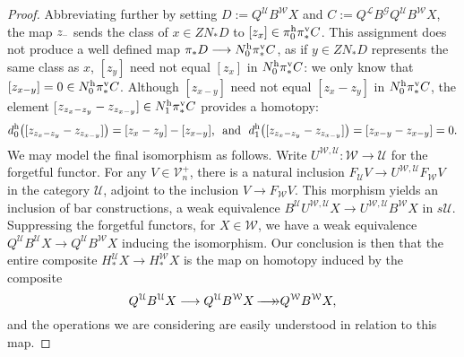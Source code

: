 \documentclass[11pt]{amsart}
\theoremstyle{plain}
\theoremstyle{definition}
\newcommand{\DASH}{\textup{--}}
\renewcommand{\to}{\longrightarrow}
\newcommand{\scrG}{\mathscr{G}}
\newcommand{\calU}{\mathcal{U}}
\newcommand{\calL}{\mathcal{L}}
\newcommand{\calV}{\mathcal{V}}
\newcommand{\calw}{\mathcal{W}}
\theoremstyle{plain}
\newcommand{\vect}[2]{\calV^{#1}_{#2}}
\newcommand{\BSW}{{\scrG}}
\newcommand{\epi}{{\,\makebox[0cm][l]{\ensuremath\to}\to}}
\begin{document}
\begin{Composite functor spectral sequences}
\begin{proof}
Abbreviating further by setting $D:=Q^{\calU}B^{\calw}X$ and $C:=Q^{\calL}B^{\BSW} Q^{\calU}B^{\calw}X$, the map $z_{\DASH}$ sends the class of $x\in ZN_*D$ to $[z_x]\in \pi_0^\textup{h}\pi^\textup{v}_*C$. This assignment does not produce a well defined map $\pi_*D\to N^\textup{h}_0\pi^\textup{v}_*C$, as if $y\in ZN_* D$ represents the same class as $x$, $[z_y]$ need not equal $[z_x]$ in $N^\textup{h}_0\pi^\textup{v}_*C$: we only know that $[z_{x-y}]=0\in N_0^\textup{h}\pi_*^\textup{v}C$.
Although $[z_{x-y}]$ need not equal $[z_{x}-z_{y}]$ in $N_0^\textup{h}\pi_*^\textup{v}C$, the element [$z_{z_{x}-z_{y}}-z_{z_{x-y}}]\in N_1^\textup{h}\pi_*^\textup{v}C$ provides a homotopy:
%
\[d_0^\textup{h}\!\left([z_{z_{x}-z_{y}}-z_{z_{x-y}}]\right)=[z_x-z_y]-[z_{x-y}]\textup{, \  and \ }d_1^\textup{h}\!\left([z_{z_{x}-z_{y}}-z_{z_{x-y}}]\right)=[z_{{x}-{y}}-z_{{x}-{y}}]=0.\]
We may model the final isomorphism as follows. Write $U^{\calw,\calU}:\calw\to\calU$ for the forgetful functor. For any $V\in\vect{+}{n}$, there is a natural inclusion $F_{\calU}V\to U^{\calw,\calU} F_{\calw}V$ in the category  $\calU$, adjoint to the inclusion $V\to F_{\calw}V$. This morphism yields an inclusion of bar constructions, a weak equivalence $B^{\calU}U^{\calw,\calU}X\to U^{\calw,\calU}B^{\calw}X$ in $s\calU$. Suppressing the forgetful functors, for $X\in\calw$, we have a weak equivalence $Q^{\calU}B^{\calU}X\to Q^{\calU}B^{\calw}X$ inducing the isomorphism. Our conclusion is then that the entire composite $H_*^{\calU}X\to H_*^{\calw}X$ is the map on homotopy induced by the composite 
\[Q^{\calU}B^{\calU}X\to Q^{\calU}B^{\calw}X \epi Q^{\calw}B^{\calw}X,\]
and the operations we are considering are easily understood in relation to this map.
\end{proof}


\end{Composite functor spectral sequences}
\end{document}
